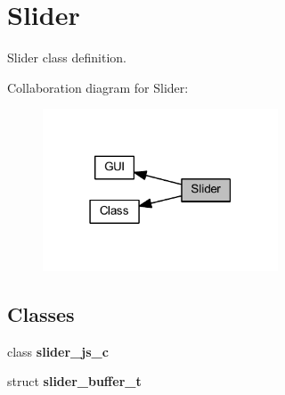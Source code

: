 \section{Slider}
\label{group___slider}


Slider class definition.  


Collaboration diagram for Slider\+:
\nopagebreak
\begin{figure}[H]
\begin{center}
\leavevmode
\includegraphics[width=198pt]{group___slider}
\end{center}
\end{figure}
\subsection*{Classes}
\begin{DoxyCompactItemize}
\item 
class \textbf{ slider\+\_\+js\+\_\+c}
\item 
struct \textbf{ slider\+\_\+buffer\+\_\+t}
\end{DoxyCompactItemize}
